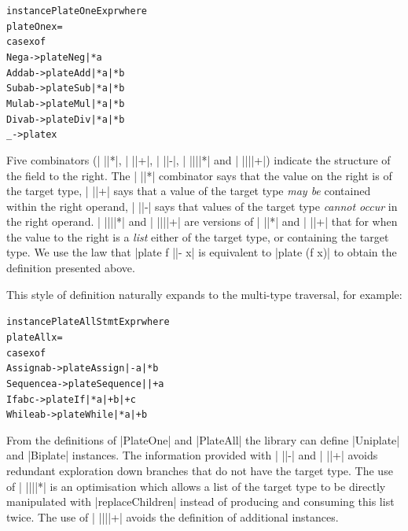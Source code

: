 \documentclass[preprint]{sigplanconf}
\newenvironment{code}{\begin{alltt}\small}{\end{alltt}}
\begin{document}

\begin{code}
instance PlateOne Expr where
    plateOne x =
        case x of
            Neg  a    -> plate Neg  |* a
            Add  a b  -> plate Add  |* a |* b
            Sub  a b  -> plate Sub  |* a |* b
            Mul  a b  -> plate Mul  |* a |* b
            Div  a b  -> plate Div  |* a |* b
            _         -> plate x
\end{code}

Five combinators (| ||*|, | ||+|, | ||-|, | ||||*| and | ||||+|) indicate the structure of the field to the right. The | ||*| combinator says that the value on the right is of the target type, | ||+| says that a value of the target type \textit{may be} contained within the right operand, | ||-| says that values of the target type \textit{cannot occur} in the right operand. | ||||*| and | ||||+| are versions of | ||*| and | ||+| that for when the value to the right is a \textit{list} either of the target type, or containing the target type. We use the law that |plate f ||- x| is equivalent to |plate (f x)| to obtain the definition presented above.

This style of definition naturally expands to the multi-type traversal, for example:

\begin{code}
instance PlateAll Stmt Expr where
    plateAll x =
        case x of
            Assign    a b    -> plate Assign    |-   a |*  b
            Sequence  a      -> plate Sequence  ||+  a
            If        a b c  -> plate If        |*   a |+  b |+ c
            While     a b    -> plate While     |*   a |+  b
\end{code}

From the definitions of |PlateOne| and |PlateAll| the library can define |Uniplate| and |Biplate| instances. The information provided with | ||-| and | ||+| avoids redundant exploration down branches that do not have the target type. The use of | ||||*| is an optimisation which allows a list of the target type to be directly manipulated with |replaceChildren| instead of producing and consuming this list twice. The use of | ||||+| avoids the definition of additional instances.
\end{document}
